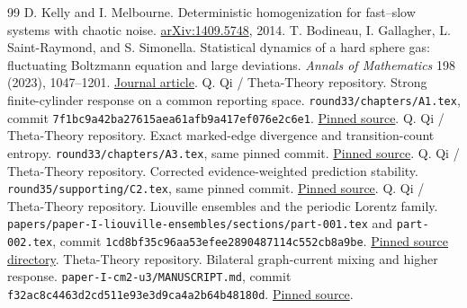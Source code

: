 \begin{thebibliography}{99}
 D. Kelly and I. Melbourne. Deterministic homogenization for fast--slow systems with chaotic noise. \href{https://arxiv.org/abs/1409.5748}{arXiv:1409.5748}, 2014.
 T. Bodineau, I. Gallagher, L. Saint-Raymond, and S. Simonella. Statistical dynamics of a hard sphere gas: fluctuating Boltzmann equation and large deviations. \emph{Annals of Mathematics} 198 (2023), 1047--1201. \href{https://annals.math.princeton.edu/2023/198-3/p03}{Journal article}.
 Q. Qi / Theta-Theory repository. Strong finite-cylinder response on a common reporting space. \texttt{round33/chapters/A1.tex}, commit \texttt{7f1bc9a42ba27615aea61afb9a417ef076e2c6e1}. \href{https://github.com/TrillionniumFoundation/theta-theory/blob/7f1bc9a42ba27615aea61afb9a417ef076e2c6e1/round33/chapters/A1.tex}{Pinned source}.
 Q. Qi / Theta-Theory repository. Exact marked-edge divergence and transition-count entropy. \texttt{round33/chapters/A3.tex}, same pinned commit. \href{https://github.com/TrillionniumFoundation/theta-theory/blob/7f1bc9a42ba27615aea61afb9a417ef076e2c6e1/round33/chapters/A3.tex}{Pinned source}.
 Q. Qi / Theta-Theory repository. Corrected evidence-weighted prediction stability. \texttt{round35/supporting/C2.tex}, same pinned commit. \href{https://github.com/TrillionniumFoundation/theta-theory/blob/7f1bc9a42ba27615aea61afb9a417ef076e2c6e1/round35/supporting/C2.tex}{Pinned source}.
 Q. Qi / Theta-Theory repository. Liouville ensembles and the periodic Lorentz family. \texttt{papers/paper-I-liouville-ensembles/sections/part-001.tex} and \texttt{part-002.tex}, commit \texttt{1cd8bf35c96aa53efee2890487114c552cb8a9be}. \href{https://github.com/TrillionniumFoundation/theta-theory/tree/1cd8bf35c96aa53efee2890487114c552cb8a9be/papers/paper-I-liouville-ensembles/sections}{Pinned source directory}.
 Theta-Theory repository. Bilateral graph-current mixing and higher response. \texttt{paper-I-cm2-u3/MANUSCRIPT.md}, commit \texttt{f32ac8c4463d2cd511e93e3d9ca4a2b64b48180d}. \href{https://github.com/TrillionniumFoundation/theta-theory/blob/f32ac8c4463d2cd511e93e3d9ca4a2b64b48180d/papers/theta-program/five-paper-series/paper-I-cm2-u3/MANUSCRIPT.md}{Pinned source}.
\end{thebibliography}
